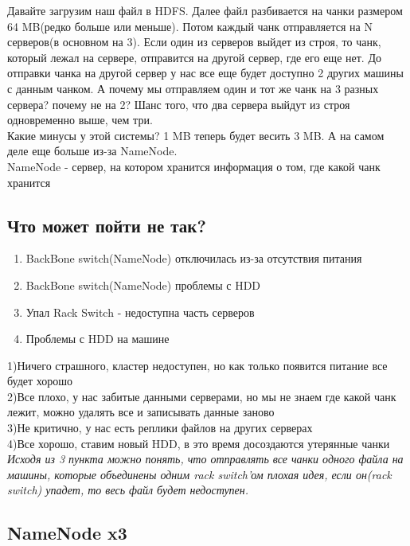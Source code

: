 \documentclass{article}
\begin{document}
Давайте загрузим наш файл в HDFS. Далее файл разбивается на чанки размером 64 MB(редко больше или меньше). Потом каждый чанк отправляется на N серверов(в основном на 3). Если один из серверов выйдет из строя, то чанк, который лежал на сервере, отправится на другой сервер, где его еще нет. До отправки чанка на другой сервер у нас все еще будет доступно 2 других машины с данным чанком.
А почему мы отправляем один и тот же чанк на 3 разных сервера? почему не на 2? Шанс того, что два сервера выйдут из строя одновременно выше, чем три.\\

Какие минусы у этой системы? 1 MB теперь будет весить 3 MB. А на самом деле еще больше из-за NameNode.\\

NameNode - сервер, на котором хранится информация о том, где какой чанк хранится

\subsection{Что может пойти не так?}

\begin{enumerate}
    \item BackBone switch(NameNode) отключилась из-за отсутствия питания
    \item BackBone switch(NameNode) проблемы с HDD
    \item Упал Rack Switch - недоступна часть серверов
    \item Проблемы с HDD на машине
\end{enumerate}
1)Ничего страшного, кластер недоступен, но как только появится питание все будет хорошо\\
2)Все плохо, у нас забитые данными серверами, но мы не знаем где какой чанк лежит, можно удалять все и записывать данные заново\\
3)Не критично, у нас есть реплики файлов на других серверах\\
4)Все хорошо, ставим новый HDD, в это время досоздаются утерянные чанки\\

\textit{Исходя из 3 пункта можно понять, что отправлять все чанки одного файла на машины, которые объединены одним rack switch'ом плохая идея, если он(rack switch) упадет, то весь файл будет недоступен.}

\subsection{NameNode x3}
\end{document}
